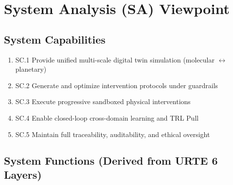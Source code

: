 \documentclass[11pt,a4paper]{report}
\begin{document}
\chapter{System Analysis (SA) Viewpoint}

\section{System Capabilities}

\begin{enumerate}[label=SC-\arabic*]
    \item SC.1 Provide unified multi-scale digital twin simulation (molecular $\leftrightarrow$ planetary)
    \item SC.2 Generate and optimize intervention protocols under guardrails
    \item SC.3 Execute progressive sandboxed physical interventions
    \item SC.4 Enable closed-loop cross-domain learning and TRL Pull
    \item SC.5 Maintain full traceability, auditability, and ethical oversight
\end{enumerate}

\section{System Functions (Derived from URTE 6 Layers)}
\end{document}
